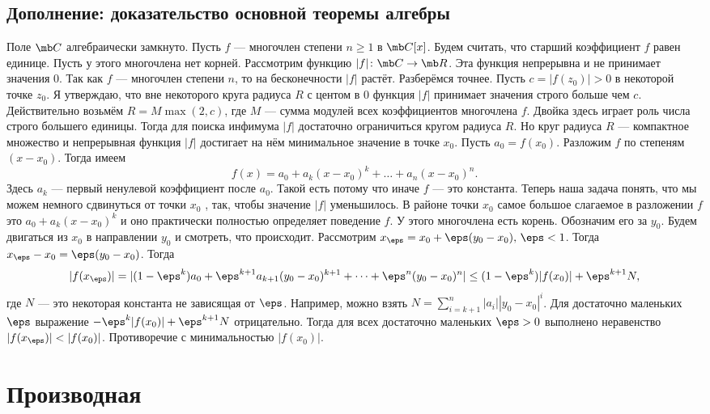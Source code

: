 \subsection*{Дополнение: доказательство основной теоремы алгебры}

\begin{thmm} Поле $\mb C$ алгебраически замкнуто.
\proof Пусть $f$ — многочлен степени $n\geq 1$ в $\mb C[x]$. Будем считать, что старший коэффициент $f$ равен единице. Пусть у этого многочлена нет корней. Рассмотрим функцию $|f|\colon \mb C \to \mb R$. Эта функция непрерывна и не принимает значения 0. Так как $f$ --- многочлен степени $n$, то на бесконечности $|f|$ растёт. Разберёмся точнее. Пусть
$c = |f(z_0)| > 0$ в некоторой точке $z_0$. Я утверждаю, что вне некоторого круга радиуса $R$ с центом в 0 функция
$|f|$ принимает значения строго больше чем $c$. Действительно возьмём $R= M \max(2,c)$, где $M$ --- сумма модулей всех коэффициентов многочлена $f$. Двойка здесь играет роль числа строго большего единицы.
Тогда для поиска инфимума $|f|$ достаточно ограничиться кругом радиуса $R$. Но круг радиуса $R$ --- компактное множество и непрерывная функция $|f|$ достигает на нём минимальное значение в точке $x_0$. Пусть $a_0 =f(x_0)$. Разложим
$f$ по степеням $(x-x_0)$. Тогда имеем
$$f(x) = a_0 + a_k (x-x_0)^k + \dots + a_n(x -x_0 )^n.$$
Здесь $a_k$ --- первый ненулевой коэффициент после $a_0$. Такой есть потому что иначе $f$ --- это константа. Теперь наша
задача понять, что мы можем немного сдвинуться от точки $x_0$ , так, чтобы значение $|f|$ уменьшилось. В районе точки
$x_0$ самое большое слагаемое в разложении $f$ это $a_0 + a_k (x-x_0)^k$ и оно практически полностью определяет поведение $f$.
У этого многочлена есть корень. Обозначим его за $y_0$. Будем двигаться из $x_0$ в направлении $y_0$ и смотреть, что происходит.
Рассмотрим $x_{\eps} = x_0 + \eps(y_0 -x_0 ), \,\eps < 1$. Тогда $x_{\eps} -x_0 = \eps(y_0 -x_0 )$. Тогда
$$|f(x_{\eps})| = |(1 - \eps^k)a_0 + \eps^{k+1} a_{k+1} (y_0 -x_0)^{k+1} + \dots+ \eps^n(y_0-x_0 )^n | \leq (1- \eps^k )|f(x_0)| + \eps^{k+1}N,$$
где $N$ — это некоторая константа не зависящая от $\eps$. Например, можно взять $N = \sum_{i=k+1}^n |a_i||y_0 -x_0 |^i$. Для достаточно
маленьких $\eps$ выражение $ -\eps^k |f(x_0)| + \eps^{k+1}N$ отрицательно. Тогда для всех достаточно маленьких $\eps>0$ выполнено неравенство $|f(x_{\eps})| < |f(x_0)|$.
Противоречие с минимальностью $|f(x_0)|$. \endproof
\end{thmm}

\section{Производная}

